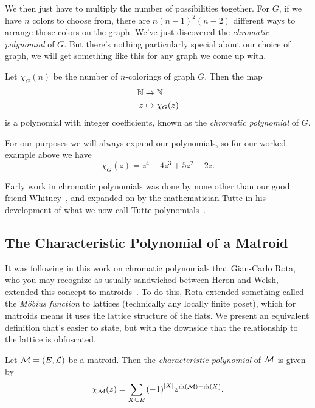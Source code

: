 \documentclass[12pt,oneside]{../../sfsuthesis}
\begin{document}
We then just have to multiply the number of possibilities together.
For \( G \), if we have \( n \) colors to choose from, there are \( n {(n-1)}^2 (n - 2) \) different ways to arrange those colors on the graph.
We've just discovered the \emph{chromatic polynomial} of \( G \).
But there's nothing particularly special about our choice of graph, we will get something like this for any graph we come up with.

\begin{definition}\th\label{def:chromaticPoly}

    Let \( \chi_G(n) \) be the number of \( n \)-colorings of graph \( G \).
    Then the map
    \begin{align*}
        \mathbb{N} & \to \mathbb{N}            \\
        z  & \mapsto \chi_G(z)
    \end{align*}
    is a polynomial with integer coefficients, known as the \emph{chromatic polynomial} of \( G \).

\end{definition}

For our purposes we will always expand our polynomials, so for our worked example above we have
\[
    \chi_G(z) = z^4 - 4z^3 + 5z^2 - 2z.
\]

Early work in chromatic polynomials was done by none other than our good friend Whitney~\cite{whitneyColoringGraphs1932}, and expanded on by the mathematician Tutte in his development of what we now call Tutte polynomials~\cite{tutteContributionTheoryChromatic1954}.

\subsection{The Characteristic Polynomial of a Matroid}

It was following in this work on chromatic polynomials that Gian-Carlo Rota, who you may recognize as usually sandwiched between Heron and Welsh, extended this concept to matroids~\cite{rotaFoundationsCombinatorialTheory1964}.
To do this, Rota extended something called the \emph{M\"obius function} to lattices (technically any locally finite poset), which for matroids means it uses the lattice structure of the flats.
We present an equivalent definition that's easier to state, but with the downside that the relationship to the lattice is obfuscated.

\begin{definition}\th\label{def:characteristicPoly}

    Let \( \mathcal{M} = (E, \mathcal{L}) \) be a matroid.
    Then the \emph{characteristic polynomial} of \( \mathcal{M} \) is given by
    \[
        \chi_{\mathcal{M}}(z) = \sum_{X \subseteq E} {(-1)}^{|X|}z^{\operatorname{rk}(\mathcal{M}) - \operatorname{rk}(X)}.
    \]
\end{definition}
\end{document}
